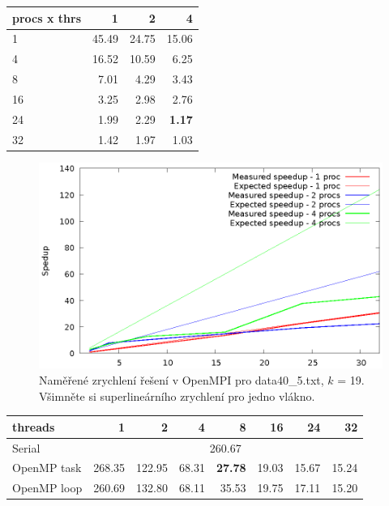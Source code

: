 \documentclass{article}
\begin{document}
\begin{center}
	\begin{tabular}{l|rrr}
		procs x thrs	& 1 & 2 & 4 \\
		\hline
		1 & 45.49 & 24.75 & 15.06 \\
		4 & 16.52 & 10.59 & 6.25 \\
		8 & 7.01 & 4.29 & 3.43 \\
		16 & 3.25 & 2.98 & 2.76 \\
		24 & 1.99 & 2.29 & \textbf{1.17} \\
		32 & 1.42 & 1.97 & 1.03 \\
	\end{tabular} 
	\label{table:parallel4}
		\begin{figure}[H]
		\centering
		\includegraphics{mpi_speedup_19_graph40_5.eps}
		\caption{Naměřené zrychlení řešení v OpenMPI pro data40\_5.txt, $k$ = 19. Všimněte si superlineárního zrychlení pro jedno vlákno.}%
	\end{figure}
\end{center}


\begin{center}
\begin{tabular}{l|rrrrrrr}
	threads	& 1 & 2 & 4 & 8 & 16 & 24 & 32  \\ 
	\hline
	Serial 		& \multicolumn{7}{c}{260.67} \\ 
	OpenMP task & 268.35 & 122.95 & 68.31 & \textbf{27.78} & 19.03 & 15.67 & 15.24 \\ 
	OpenMP loop & 260.69 & 132.80 & 68.11 & 35.53 & 19.75 & 17.11 & 15.20 \\
\end{tabular} 
\label{table:parallel5}
\end{center}
\end{document}
